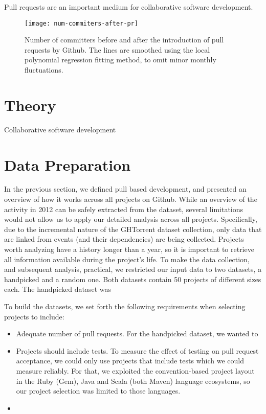 \documentclass{sig-alternate}
\begin{document}
Pull requests are an important medium for collaborative software development.

\begin{figure}
  \begin{center}
    \texttt{[image: num-commiters-after-pr]}
  \end{center}
  \caption{Number of committers before and after the introduction of pull
  requests by Github. The lines are smoothed using the local polynomial
  regression fitting method, to omit minor monthly fluctuations.}
  \label{fig:}
\end{figure}

\section{Theory}

Collaborative software development 
\cite{Smite10}
\cite{Magnu93}

\section{Data Preparation}

In the previous section, we defined pull based development, and presented an
overview of how it works across all projects on Github. While an overview of the
activity in 2012 can be safely extracted from the dataset, several limitations
would not allow us to apply our detailed analysis across all projects.
Specifically, due to the incremental nature of the GHTorrent dataset collection,
only data that are linked from events (and their dependencies) are being
collected. Projects worth analyzing have a history longer than a year, so it is
important to retrieve all information available during the project's life. To
make the data collection, and subsequent analysis, practical, we restricted our
input data to two datasets, a \textsf{handpicked} and a \textsf{random} one. 
Both datasets contain 50 projects of different sizes each. The 
\textsf{handpicked} dataset was 


To build the datasets, we set forth the following requirements when selecting
projects to include:

\begin{itemize}

  \item Adequate number of pull requests. For the \textsf{handpicked} dataset,
    we wanted to 

  \item Projects should include tests. To measure the effect of testing on pull
    request acceptance, we could only use projects that include tests which we
    could measure reliably. For that, we exploited the convention-based project
    layout in the Ruby (Gem), Java and Scala (both Maven) language ecosystems,
    so our project selection was limited to those languages. 

  \item 

\end{itemize}
\end{document}
